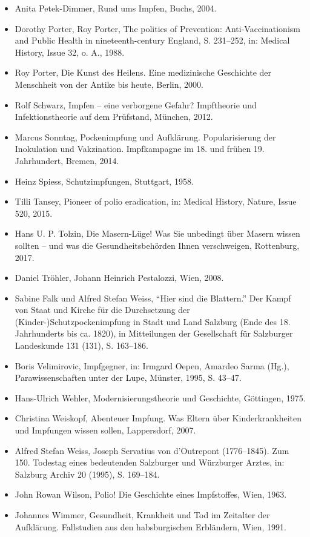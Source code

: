 \documentclass[
    a4paper,
    12pt,
    hyphens,
    chapterprefix=true,
    headheight=33pt,
    footheight=29pt,
    headings=optiontohead,
]{scrartcl}
\begin{document}
{\begin{itemize}
\item{Anita Petek-Dimmer, Rund ums Impfen, Buchs, 2004.}
\item{Dorothy Porter, Roy Porter, The politics of Prevention: Anti-Vaccinationism and Public Health in nineteenth-century England, S. 231--252, in: Medical History, Issue 32, o. A., 1988.}
\item{Roy Porter, Die Kunst des Heilens. Eine medizinische Geschichte der Menschheit von der Antike bis heute, Berlin, 2000.}
\item{Rolf Schwarz, Impfen -- eine verborgene Gefahr? Impftheorie und Infektionstheorie auf dem Prüfstand, München, 2012.}
\item{Marcus Sonntag, Pockenimpfung und Aufklärung. Popularisierung der Inokulation und Vakzination. Impfkampagne im 18. und frühen 19. Jahrhundert, Bremen, 2014.}
\item{Heinz Spiess, Schutzimpfungen, Stuttgart, 1958.}
\item{Tilli Tansey, Pioneer of polio eradication, in: Medical History, Nature, Issue 520, 2015.}
\item{Hans U. P. Tolzin, Die Masern-Lüge! Was Sie unbedingt über Masern wissen sollten -- und was die Gesundheitsbehörden Ihnen verschweigen, Rottenburg, 2017.}
\item{Daniel Tröhler, Johann Heinrich Pestalozzi, Wien, 2008.}
\item{Sabine Falk und Alfred Stefan Weiss, "`Hier sind die Blattern."' Der Kampf von Staat und Kirche für die Durchsetzung der (Kinder-)Schutzpockenimpfung in Stadt und Land Salzburg (Ende des 18. Jahrhunderts bis ca. 1820), in Mitteilungen der Gesellschaft für Salzburger Landeskunde 131 (131), S. 163--186.}
\item{Boris Velimirovic, Impfgegner, in: Irmgard Oepen, Amardeo Sarma (Hg.), Parawissenschaften unter der Lupe, Münster, 1995, S. 43--47.}
\item{Hans-Ulrich Wehler, Modernisierungstheorie und Geschichte, Göttingen, 1975.}
\item{Christina Weiskopf, Abenteuer Impfung. Was Eltern über Kinderkrankheiten und Impfungen wissen sollen, Lappersdorf, 2007.}
\item{Alfred Stefan Weiss, Joseph Servatius von d'Outrepont (1776--1845). Zum 150. Todestag eines bedeutenden Salzburger und Würzburger Arztes, in: Salzburg Archiv 20 (1995), S. 169--184.}
\item{John Rowan Wilson, Polio! Die Geschichte eines Impfstoffes, Wien, 1963.}
\item{Johannes Wimmer, Gesundheit, Krankheit und Tod im Zeitalter der Aufklärung. Fallstudien aus den habsburgischen Erbländern, Wien, 1991.}

\end{itemize}}
\end{document}
